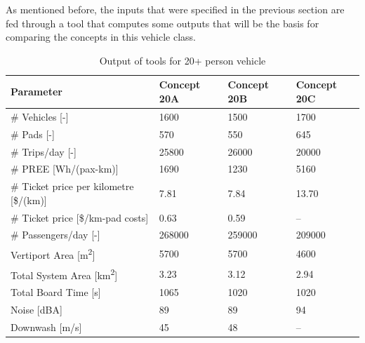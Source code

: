 As mentioned before, the inputs that were specified in the previous section are fed through a tool that computes some outputs that will be the basis for comparing the concepts in this vehicle class.  


\begin{table}[H]
\captionsetup{justification=centering}
\caption{Output of tools for 20+ person vehicle}
\label{20output}
\begin{tabular}{@{}llll@{}}
\toprule
\textbf{Parameter}                           & \textbf{Concept 20A} & \textbf{Concept 20B} & \textbf{Concept 20C} \\ \midrule
\# Vehicles {[}-{]}                          &       1600             &     1500            &      1700                 \\
\# Pads {[}-{]}                              &         570           &      550           &          645            \\
\# Trips/day {[}-{]}                         &         25800           &       26000          &         20000               \\
\#  PREE {[}Wh/(pax-km){]}           &        1690           &       1230         &         5160            \\
\# Ticket price per kilometre {[}\$/(km){]} &           7.81           &          7.84       &        13.70               \\
\# Ticket price {[}\$/km-pad costs{]}        & 0.63                    &      0.59            &   --            \\
\# Passengers/day {[}-{]}                    &         268000           &       259000          &      209000               \\
Vertiport Area {[}m\textsuperscript{2}{]}    &           5700         &        5700         &        4600              \\
Total System Area {[}km\textsuperscript{2}{]} &       3.23             &      3.12           &       2.94               \\
Total Board Time {[}s{]}                     & 1065                   &     1020            &      1020                \\
Noise {[}dBA{]}                              &           89        &      89           &       94                  \\
Downwash {[}m/s{]}                              &             45       &     48          &  --   \\ \bottomrule
\end{tabular}

\end{table}

